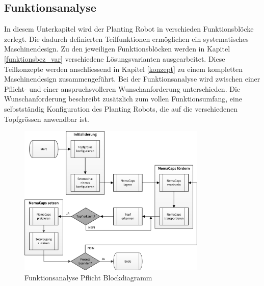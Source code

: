 \subsection{Funktionsanalyse}
In diesem Unterkapitel wird der Planting Robot in verschieden Funktionsblöcke zerlegt. Die dadurch definierten Teilfunktionen ermöglichen ein systematisches Maschinendesign. Zu den jeweiligen Funktionsblöcken werden in Kapitel \ref{funktionsbez_var} verschiedene Lösungsvarianten ausgearbeitet. Diese Teilkonzepte werden anschliessend in Kapitel \ref{konzept} zu einem kompletten Maschinendesign zusammengeführt.\newline
Bei der Funktionsanalyse wird zwischen einer Pflicht- und einer anspruchsvolleren  Wunschanforderung unterschieden. Die Wunschanforderung beschreibt zusätzlich zum vollen Funktionsumfang, eine selbstständig Konfiguration des Planting Robots, die auf die verschiedenen Topfgrössen anwendbar ist.

\begin{figure}[H]
	\includegraphics[width=0.8\textwidth]{Illustrationen/4-Entwurf/Funktionsanalyse_Pflicht.png}
	\caption{Funktionsanalyse Pflicht Blockdiagramm}
	\label{fig:FunktPflicht}
\end{figure}

